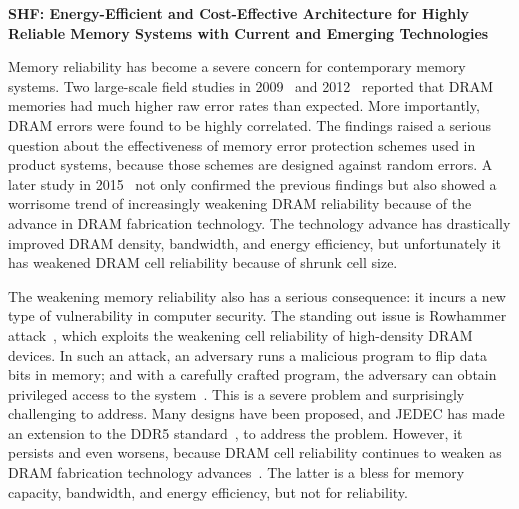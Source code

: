 \documentclass[11pt]{article}
\begin{document}

\begin{center}
{\Large\bf SHF: Energy-Efficient and Cost-Effective Architecture for
Highly Reliable Memory Systems with Current and Emerging Technologies}
\end{center}
\vspace{0.5cm}




Memory reliability has become a severe concern for contemporary memory systems.
Two large-scale field studies in 2009~\cite{2009-sigm-dram-error} and
2012~\cite{2012-sc-dram-error} reported that DRAM memories had much
higher raw error rates than expected.  More importantly, DRAM errors were found
to be highly correlated. The findings raised a serious question about the
effectiveness of memory error protection schemes used in product systems,
because those schemes are designed against random errors.  A later study in
2015~\cite{2015-asplos-dram-error} not only confirmed the previous findings but
also showed a worrisome trend of increasingly weakening DRAM reliability because
of the advance in DRAM fabrication technology.  The technology advance has
drastically improved DRAM density, bandwidth, and energy efficiency, but
unfortunately it has weakened DRAM cell reliability because of shrunk cell size.


The weakening memory reliability also has a serious consequence: it incurs a new type
of vulnerability in computer security.  The standing out issue is Rowhammer
attack~\cite{kim2014flipping,mutlu2017rowhammer}, which exploits the weakening cell reliability of high-density
DRAM devices.  In such an attack, an adversary runs a malicious program to flip
data bits in memory; and with a carefully crafted program, the adversary can
obtain privileged access to the system~\cite{Seaborn}.  This is a severe problem and
surprisingly challenging to address.  Many designs have been proposed, and JEDEC
has made an extension to the DDR5 standard~\cite{JEDEC:2024}, to address the problem.
However, it persists and even worsens, because DRAM cell reliability continues
to weaken as DRAM fabrication technology advances~\cite{Canpolat:hpca25}.  The latter is a
bless for memory capacity, bandwidth, and energy efficiency, but not for
reliability.
\end{document}
